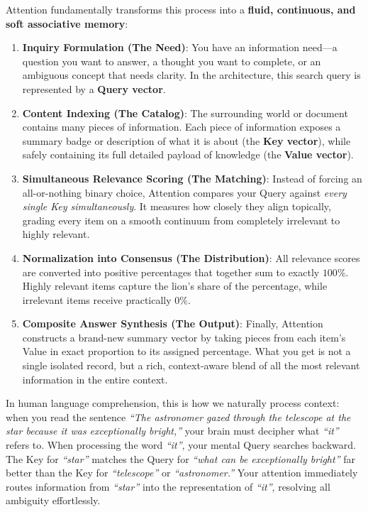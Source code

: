 \documentclass[11pt,a4paper]{article}
\theoremstyle{definition}
\begin{document}
Attention fundamentally transforms this process into a \textbf{fluid, continuous, and soft associative memory}:
\begin{enumerate}
    \item \textbf{Inquiry Formulation (The Need)}: You have an information need—a question you want to answer, a thought you want to complete, or an ambiguous concept that needs clarity. In the architecture, this search query is represented by a \textbf{Query vector}.
    \item \textbf{Content Indexing (The Catalog)}: The surrounding world or document contains many pieces of information. Each piece of information exposes a summary badge or description of what it is about (the \textbf{Key vector}), while safely containing its full detailed payload of knowledge (the \textbf{Value vector}).
    \item \textbf{Simultaneous Relevance Scoring (The Matching)}: Instead of forcing an all-or-nothing binary choice, Attention compares your Query against \emph{every single Key simultaneously}. It measures how closely they align topically, grading every item on a smooth continuum from completely irrelevant to highly relevant.
    \item \textbf{Normalization into Consensus (The Distribution)}: All relevance scores are converted into positive percentages that together sum to exactly $100\%$. Highly relevant items capture the lion's share of the percentage, while irrelevant items receive practically $0\%$.
    \item \textbf{Composite Answer Synthesis (The Output)}: Finally, Attention constructs a brand-new summary vector by taking pieces from each item's Value in exact proportion to its assigned percentage. What you get is not a single isolated record, but a rich, context-aware blend of all the most relevant information in the entire context.
\end{enumerate}

In human language comprehension, this is how we naturally process context: when you read the sentence \emph{``The astronomer gazed through the telescope at the star because it was exceptionally bright,''} your brain must decipher what \emph{``it''} refers to. When processing the word \emph{``it''}, your mental Query searches backward. The Key for \emph{``star''} matches the Query for \emph{``what can be exceptionally bright''} far better than the Key for \emph{``telescope''} or \emph{``astronomer.''} Your attention immediately routes information from \emph{``star''} into the representation of \emph{``it''}, resolving all ambiguity effortlessly.
\end{document}
